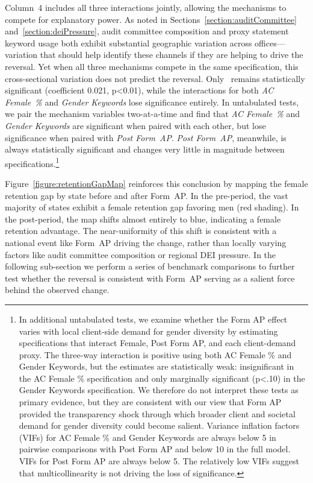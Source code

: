 \documentclass[11pt]{article}
\begin{document}
            Column~4 includes all three interactions jointly, allowing the mechanisms to compete for explanatory power. As noted in Sections~\ref{section:auditCommittee} and~\ref{section:deiPressure}, audit committee composition and proxy statement keyword usage both exhibit substantial geographic variation across offices---variation that should help identify these channels if they are helping to drive the reversal. Yet when all three mechanisms compete in the same specification, this cross-sectional variation does not predict the reversal. Only \FEMALExPOSTFORMAP\ remains statistically significant (coefficient 0.021, p<0.01), while the interactions for both \textit{AC Female~\%} and \textit{Gender Keywords} lose significance entirely. In untabulated tests, we pair the mechanism variables two-at-a-time and find that \textit{AC Female~\%} and \textit{Gender Keywords} are significant when paired with each other, but lose significance when paired with \textit{Post Form~AP}. \textit{Post Form~AP}, meanwhile, is always statistically significant and changes very little in magnitude between specifications.\footnote{In additional untabulated tests, we examine whether the Form AP effect varies with local client-side demand for gender diversity by estimating specifications that interact Female, Post Form AP, and each client-demand proxy. The three-way interaction is positive using both AC Female \% and Gender Keywords, but the estimates are statistically weak: insignificant in the AC Female \% specification and only marginally significant (p<.10) in the Gender Keywords specification. We therefore do not interpret these tests as primary evidence, but they are consistent with our view that Form AP provided the transparency shock through which broader client and societal demand for gender diversity could become salient. Variance inflation factors (VIFs) for AC Female \% and Gender Keywords are always below 5 in pairwise comparisons with Post Form AP and below 10 in the full model. VIFs for Post Form AP are always below 5. The relatively low VIFs suggest that multicollinearity is not driving the loss of significance.
} 

            Figure~\ref{figure:retentionGapMap} reinforces this conclusion by mapping the female retention gap by state before and after Form~AP. In the pre-period, the vast majority of states exhibit a female retention gap favoring men (red shading). In the post-period, the map shifts almost entirely to blue, indicating a female retention advantage. The near-uniformity of this shift is consistent with a national event like Form~AP driving the change, rather than locally varying factors like audit committee composition or regional DEI pressure. In the following sub-section we perform a series of benchmark comparisons to further test whether the reversal is consistent with Form~AP serving as a salient force behind the observed change.
\end{document}
